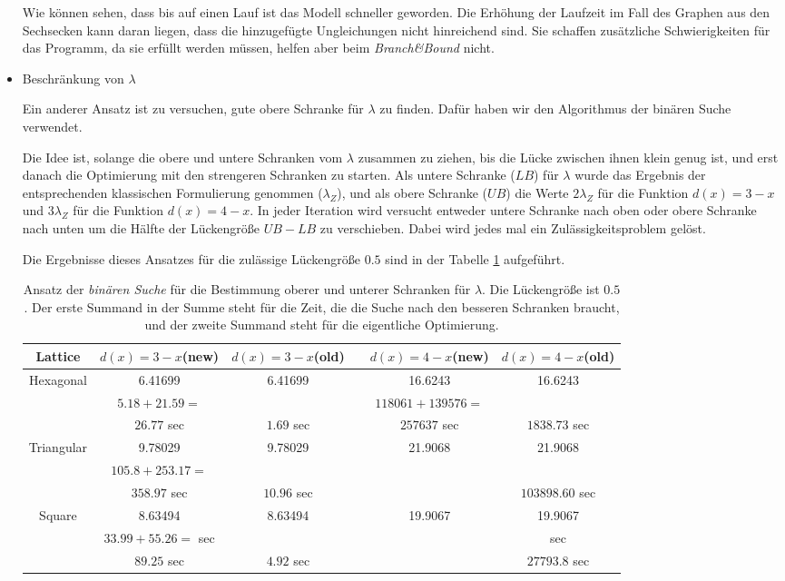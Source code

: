 \documentclass[
	fontsize=12pt,
	paper=a4,
	twoside=false,
	numbers=noenddot,
	plainheadsepline,
	toc=listof,
	toc=bibliography
]{scrartcl}
\begin{document}
\begin{itemize}
	Wie können sehen, dass bis auf einen Lauf ist das Modell schneller geworden. Die Erhöhung der Laufzeit im Fall des Graphen aus den Sechsecken kann daran liegen, dass die hinzugefügte Ungleichungen nicht hinreichend sind. Sie schaffen zusätzliche Schwierigkeiten für das Programm, da sie erfüllt werden müssen, helfen aber beim {\it Branch\&Bound} nicht. 

	\item Beschränkung von $\lambda$ 
	
	Ein anderer Ansatz ist zu versuchen, gute obere Schranke für $\lambda$ zu finden. Dafür haben wir den Algorithmus der binären Suche verwendet.
	
	Die Idee ist, solange die obere und untere Schranken vom $\lambda$ zusammen zu ziehen, bis die Lücke zwischen ihnen klein genug ist, und erst danach die Optimierung mit den strengeren Schranken zu starten.
	Als untere %
	Schranke ($LB$) für $\lambda$ wurde das Ergebnis der entsprechenden klassischen Formulierung genommen ($\lambda_Z$), und als obere Schranke ($UB$) die Werte $2\lambda_Z$ für die Funktion $d(x)=3-x$ und $3\lambda_Z$ für die Funktion $d(x)=4-x$. In jeder Iteration wird versucht entweder untere Schranke nach oben oder obere Schranke nach unten um die Hälfte der Lückengröße $UB-LB$ zu verschieben. Dabei wird jedes mal ein Zulässigkeitsproblem gelöst. 
	
	Die Ergebnisse dieses Ansatzes für die zulässige Lückengröße $0.5$ sind in der Tabelle \ref{Table:BB} aufgeführt.
	
	\begin{table}[htbp]
	\centering
	\begin{tabular}{|c|c|c|c|c|c|}
	\hline Lattice& $d(x)=3-x$(new)  & $d(x)=3-x$(old) && $d(x)=4-x$(new)  & $d(x)=4-x$(old)\\ \hline 
		Hexagonal	&  6.41699	& 6.41699 && 16.6243 & 16.6243 \\ 
			& $5.18+21.59 =$ 	&  && $118061+139576 = $ &  \\ 
			& $26.77$ sec	& $1.69$ sec && $257637$ sec &  $1838.73$ sec \\ \hline
		Triangular	& 9.78029	&  9.78029 && 21.9068 & 21.9068 \\
			& $105.8+253.17 = $ 	&  && &  \\ 
			& $358.97$ sec	& $10.96$ sec && & $103898.60$ sec \\ \hline
		Square	& 8.63494	&   8.63494 &&  19.9067 & 19.9067\\
			& $33.99+55.26 = $ sec &  &&  &  sec \\
			& $89.25$ sec & $4.92$ sec &&  & $27793.8$ sec \\
	\hline
	\end{tabular}
	\caption{ Ansatz der {\it binären Suche} für die Bestimmung oberer und unterer Schranken für $\lambda$. Die Lückengröße ist $0.5$. Der erste Summand in der Summe steht für die Zeit, die die Suche nach den besseren Schranken braucht, und der zweite Summand steht für die eigentliche Optimierung.} 
	\label{Table:BB}
	\end{table}
	

\end{itemize}
\end{document}
